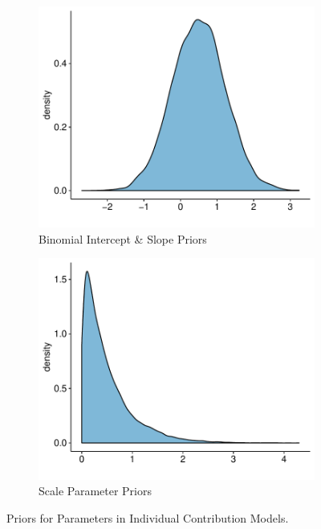\documentclass[12pt]{article}
\begin{document}
\begin{appendices}
\begin{figure}[!htb]
\begin{subfigure}[b]{0.45\textwidth}
        \includegraphics[width=\linewidth]{pac_logit.pdf}
        \caption{Binomial Intercept \& Slope Priors}
    \end{subfigure}
    \begin{subfigure}[b]{0.45\textwidth}
    	\centering
        \includegraphics[width=\linewidth]{pac_scale.pdf}
        \caption{Scale Parameter Priors}
    \end{subfigure}
    \caption{Priors for Parameters in Individual Contribution Models.}
    \label{fig: priors}
\end{figure}


\end{appendices}
\end{document}
